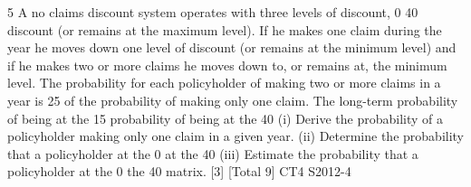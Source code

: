 5 A no claims discount system operates with three levels of discount, 0%
40%
discount (or remains at the maximum level). If he makes one claim during the year he
moves down one level of discount (or remains at the minimum level) and if he makes
two or more claims he moves down to, or remains at, the minimum level.
The probability for each policyholder of making two or more claims in a year is 25%
of the probability of making only one claim.
The long-term probability of being at the 15%
probability of being at the 40%
(i) Derive the probability of a policyholder making only one claim in a given
year. 
(ii) Determine the probability that a policyholder at the 0%
at the 40%
(iii) Estimate the probability that a policyholder at the 0%
the 40%
matrix. [3]
[Total 9]
CT4 S2012-4

